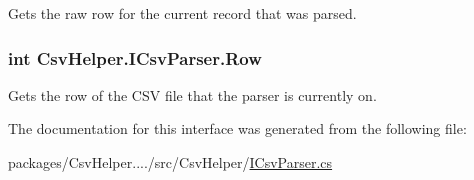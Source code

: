 Gets the raw row for the current record that was parsed. 

\hypertarget{a00087_a0ec83f976594f51a002448fa2fe2e392}{
\subsubsection[{Row}]{\setlength{\rightskip}{0pt plus 5cm}int Csv\-Helper.\-I\-Csv\-Parser.\-Row\hspace{0.3cm}{\ttfamily [get]}}}\label{a00087_a0ec83f976594f51a002448fa2fe2e392}


Gets the row of the C\-S\-V file that the parser is currently on. 



The documentation for this interface was generated from the following file\-:\begin{DoxyCompactItemize}
\item 
packages/\-Csv\-Helper..../src/\-Csv\-Helper/\hyperlink{a00206}{I\-Csv\-Parser.\-cs}\end{DoxyCompactItemize}
